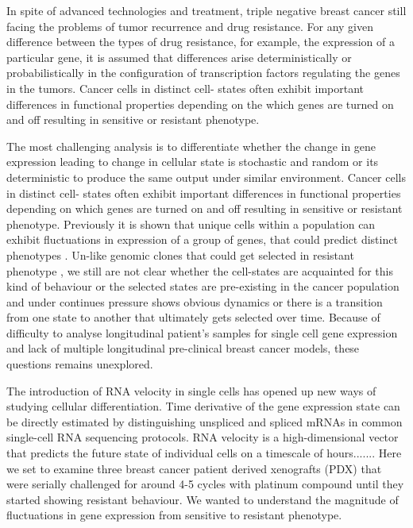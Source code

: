 In spite of advanced technologies and treatment, triple negative breast cancer still facing the problems of tumor recurrence and drug resistance.
For any given difference between the types of drug resistance, for example, the expression of a particular gene, it is assumed that differences arise deterministically or probabilistically in the configuration of transcription factors regulating the genes in the tumors. Cancer cells in distinct cell- states often exhibit important differences in functional properties depending on the which genes are turned on and off resulting in sensitive or resistant phenotype.

The most challenging analysis is to differentiate whether the change in gene expression leading to change in cellular state is stochastic\cite{raj2008nature} and random or its deterministic to produce the same output under similar environment.
Cancer cells in distinct cell- states often exhibit important differences in functional properties depending on which genes are turned on and off resulting in sensitive  or resistant phenotype.
Previously it is shown that unique cells within a population can exhibit fluctuations in expression of a group of genes, that could predict distinct phenotypes \cite{shaffer2019memory}.
Un-like genomic clones that could get selected in resistant phenotype \cite{salehi2020single}, we still are not clear whether the cell-states are acquainted for this kind of behaviour or the selected states are pre-existing in the cancer population and under continues pressure shows obvious dynamics or there is a transition from one state to another that ultimately gets selected over time. Because of difficulty to analyse longitudinal patient's samples for single cell gene expression and lack of multiple longitudinal pre-clinical breast cancer models, these questions remains unexplored.

The introduction of RNA velocity in single cells has opened up new ways of studying cellular differentiation. Time derivative of the gene expression state can be directly estimated by distinguishing unspliced and spliced mRNAs in common single-cell RNA sequencing protocols. RNA velocity is a high-dimensional vector that predicts the future state of individual cells on a timescale of hours.......
Here we set to examine three breast cancer patient derived xenografts (PDX) that were serially challenged for around 4-5 cycles with platinum compound until they started showing resistant behaviour. We wanted to understand the magnitude of fluctuations in gene expression from sensitive to resistant phenotype.


